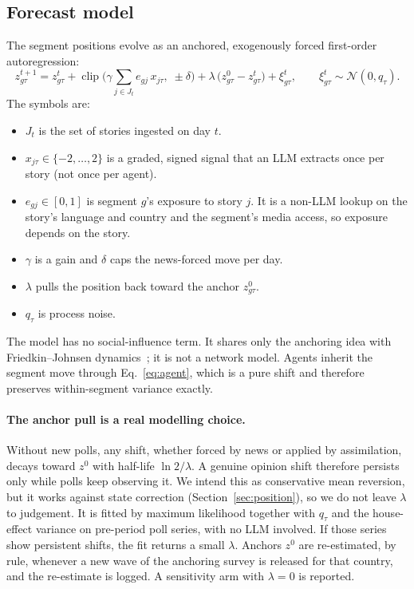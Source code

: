 \documentclass[11pt]{article}
\begin{document}
\subsection{Forecast model}\label{sec:dynamics}
The segment positions evolve as an anchored, exogenously forced first-order autoregression:
\begin{equation}\label{eq:update}
z_{g\tau}^{t+1} = z_{g\tau}^{t} + \operatorname{clip}\!\Big(\gamma\sum_{j\in J_t} e_{gj}\,x_{j\tau},\;\pm\delta\Big) + \lambda\,\big(z_{g\tau}^{0}-z_{g\tau}^{t}\big) + \xi_{g\tau}^{t},\qquad \xi_{g\tau}^{t}\sim\mathcal{N}(0,q_\tau).
\end{equation}
The symbols are:
\begin{itemize}
  \item $J_t$ is the set of stories ingested on day $t$.
  \item $x_{j\tau}\in\{-2,\dots,2\}$ is a graded, signed signal that an LLM extracts once per story (not once per agent).
  \item $e_{gj}\in[0,1]$ is segment $g$'s exposure to story $j$. It is a non-LLM lookup on the story's language and country and the segment's media access, so exposure depends on the story.
  \item $\gamma$ is a gain and $\delta$ caps the news-forced move per day.
  \item $\lambda$ pulls the position back toward the anchor $z^0_{g\tau}$.
  \item $q_\tau$ is process noise.
\end{itemize}

The model has no social-influence term. It shares only the anchoring idea with Friedkin--Johnsen dynamics~\citep{friedkin1990social}; it is not a network model. Agents inherit the segment move through Eq.~\eqref{eq:agent}, which is a pure shift and therefore preserves within-segment variance exactly.

\paragraph{The anchor pull is a real modelling choice.} Without new polls, any shift, whether forced by news or applied by assimilation, decays toward $z^0$ with half-life $\ln 2/\lambda$. A genuine opinion shift therefore persists only while polls keep observing it. We intend this as conservative mean reversion, but it works against state correction (Section~\ref{sec:position}), so we do not leave $\lambda$ to judgement. It is fitted by maximum likelihood together with $q_\tau$ and the house-effect variance on pre-period poll series, with no LLM involved. If those series show persistent shifts, the fit returns a small $\lambda$. Anchors $z^0$ are re-estimated, by rule, whenever a new wave of the anchoring survey is released for that country, and the re-estimate is logged. A sensitivity arm with $\lambda=0$ is reported.
\end{document}
